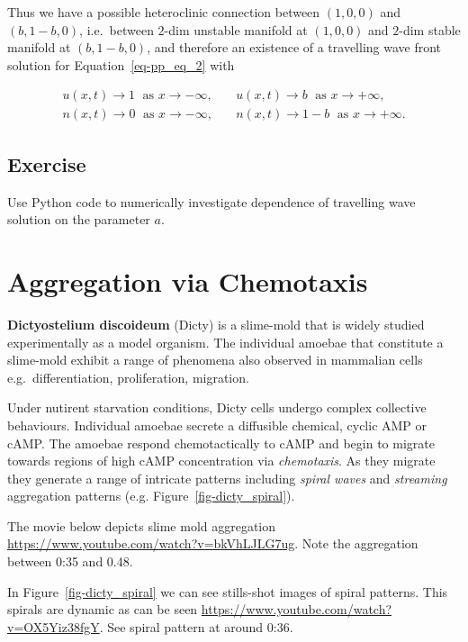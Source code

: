 \documentclass[
  letterpaper,
  DIV=11,
  numbers=noendperiod]{scrreprt}
\theoremstyle{definition}
\theoremstyle{plain}
\theoremstyle{plain}
\theoremstyle{remark}
\begin{document}
Thus we have a possible heteroclinic connection between \((1,0,0)\) and
\((b, 1-b, 0)\), i.e.~between \(2\)-dim unstable manifold at \((1,0,0)\)
and \(2\)-dim stable manifold at \((b, 1-b, 0)\), and therefore an
existence of a travelling wave front solution for
Equation~\ref{eq-pp_eq_2} with

\[
\begin{aligned}
u(x,t) \to 1 \; \textrm{ as } x \to - \infty,  \quad & u(x,t) \to b \; \textrm{ as } x \to +\infty,  \\
n(x,t) \to 0 \;  \textrm{ as } x \to - \infty ,  \quad & n(x,t) \to 1-b \; \textrm{ as } x \to +\infty.
\end{aligned}
\]

\hypertarget{exercise}{%
\section{Exercise}\label{exercise}}

Use Python code to numerically investigate dependence of travelling wave
solution on the parameter \(a\).

\hypertarget{aggregation-via-chemotaxis}{%
\chapter{Aggregation via Chemotaxis}\label{aggregation-via-chemotaxis}}

\textbf{Dictyostelium discoideum} (Dicty) is a slime-mold that is widely
studied experimentally as a model organism. The individual amoebae that
constitute a slime-mold exhibit a range of phenomena also observed in
mammalian cells e.g.~differentiation, proliferation, migration.

Under nutirent starvation conditions, Dicty cells undergo complex
collective behaviours. Individual amoebae secrete a diffusible chemical,
cyclic AMP or cAMP. The amoebae respond chemotactically to cAMP and
begin to migrate towards regions of high cAMP concentration via
\emph{chemotaxis}. As they migrate they generate a range of intricate
patterns including \emph{spiral waves} and \emph{streaming} aggregation
patterns (e.g. Figure~\ref{fig-dicty_spiral}).

The movie below depicts slime mold aggregation
\url{https://www.youtube.com/watch?v=bkVhLJLG7ug}. Note the aggregation
between 0:35 and 0.48.

In Figure~\ref{fig-dicty_spiral} we can see stills-shot images of spiral
patterns. This spirals are dynamic as can be seen
\url{https://www.youtube.com/watch?v=OX5Yiz38fgY}. See spiral pattern at
around 0:36.
\end{document}
